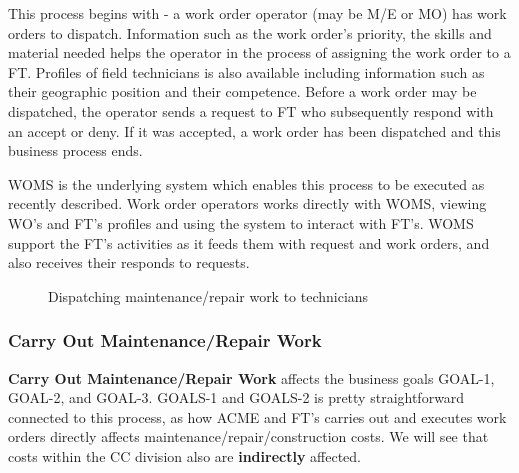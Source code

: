 This process begins with - a work order operator (may be M/E or MO) has work orders to dispatch. Information such as the work order's priority, the skills and material needed helps the operator in the process of assigning the work order to a FT. Profiles of field technicians is also available including information such as their geographic position and their competence. Before a work order may be dispatched, the operator sends a request to FT who subsequently respond with an accept or deny. If it was accepted, a work order has been dispatched and this business process ends.

WOMS is the underlying system which enables this process to be executed as recently described. Work order operators works directly with WOMS, viewing WO's and FT's profiles and using the system to interact with FT's. WOMS support the FT's activities as it feeds them with request and work orders, and also receives their responds to requests.
\begin{figure}[H]
	\centering
	\setlength\fboxsep{7pt}
	\setlength\fboxrule{0.5pt}
	\label{fig:dispatch}
	\caption{Dispatching maintenance/repair work to technicians}
\end{figure}
%
\subsubsection{Carry Out Maintenance/Repair Work}
\label{sec:bp4}
\textbf{Carry Out Maintenance/Repair Work} affects the business goals GOAL-1, GOAL-2, and GOAL-3. GOALS-1 and GOALS-2 is pretty straightforward connected to this process, as how ACME and FT's carries out and executes work orders directly affects maintenance/repair/construction costs. We will see that costs within the CC division also are \textbf{indirectly} affected.


